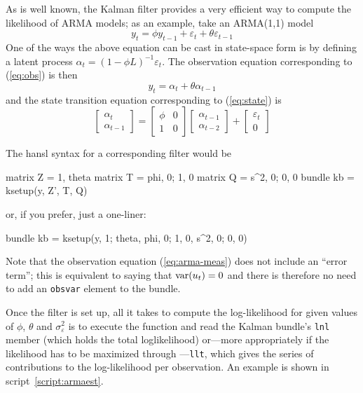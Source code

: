 As is well known, the Kalman filter provides a very efficient way to
compute the likelihood of ARMA models; as an example, take an
ARMA(1,1) model
\[
  y_t = \phi y_{t-1} + \varepsilon_t + \theta \varepsilon_{t-1}
\]
One of the ways the above equation can be cast in state-space form is
by defining a latent process $\alpha_t = (1 - \phi L)^{-1}
\varepsilon_t$.   The observation equation corresponding to (\ref{eq:obs})
is then
%
\begin{equation}
y_t = \alpha_t + \theta \alpha_{t-1} \label{eq:arma-meas}
\end{equation}
%
and the state transition equation corresponding to (\ref{eq:state}) is
%
\[
  \left[ \begin{array}{c} \alpha_t \\ \alpha_{t-1} \end{array} \right] =
  \left[ \begin{array}{cc} \phi & 0 \\ 1 & 0 \end{array} \right]
  \left[ \begin{array}{c} \alpha_{t-1} \\ \alpha_{t-2} \end{array} \right] +
  \left[ \begin{array}{c} \varepsilon_t \\ 0 \end{array} \right]
\]

The \textsf{hansl} syntax for a corresponding filter would be
\begin{code}
matrix Z = {1, theta}
matrix T = {phi, 0; 1, 0}
matrix Q = {s^2, 0; 0, 0}
bundle kb = ksetup(y, Z', T, Q)
\end{code}
%
or, if you prefer, just a one-liner:
\begin{code}
bundle kb = ksetup(y, {1; theta}, {phi, 0; 1, 0}, {s^2, 0; 0, 0})
\end{code}

Note that the observation equation (\ref{eq:arma-meas}) does not
include an ``error term''; this is equivalent to saying that
$\mbox{var}(u_t) = 0$ and there is therefore no need to add
an \texttt{obsvar} element to the bundle.

Once the filter is set up, all it takes to compute the log-likelihood
for given values of $\phi$, $\theta$ and $\sigma^2_{\varepsilon}$ is
to execute the  function and read the Kalman bundle's
\texttt{lnl} member (which holds the total loglikelihood) or---more
appropriately if the likelihood has to be maximized through
---\texttt{llt}, which gives the series of contributions to
the log-likelihood per observation. An example is shown in
script~\ref{script:armaest}.

